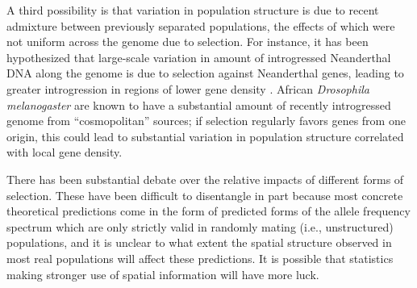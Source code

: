 \documentclass[11pt, oneside]{article}   	%
\begin{document}
A third possibility is that variation in population structure is due to recent admixture between previously separated populations,
the effects of which were not uniform across the genome due to selection.
For instance, it has been hypothesized that large-scale variation in amount of introgressed Neanderthal DNA along the genome
is due to selection against Neanderthal genes, leading to greater introgression in regions of lower gene density
\citep{harris2016genetic,juric2016strength}.
African \textit{Drosophila melanogaster} are known to have a substantial amount of recently introgressed genome from ``cosmopolitan'' sources;
if selection regularly favors genes from one origin,
this could lead to substantial variation in population structure correlated with local gene density.

There has been substantial debate over the relative impacts of different forms of selection.
These have been difficult to disentangle in part because most concrete theoretical predictions
come in the form of predicted forms of the allele frequency spectrum which are only strictly valid in randomly mating (i.e., unstructured) populations,
and it is unclear to what extent the spatial structure observed in most real populations will affect these predictions.
It is possible that statistics making stronger use of spatial information
will have more luck.
\end{document}
